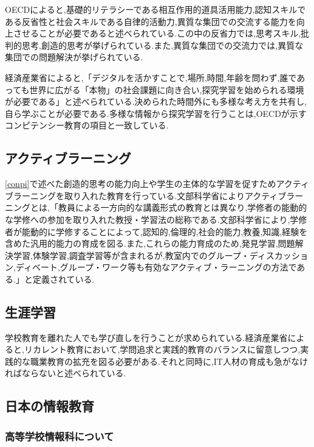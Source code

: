 \documentclass[11pt, a4paper]{jreport}
\begin{document}
OECDによると,基礎的リテラシーである相互作用的道具活用能力,認知スキルである反省性と社会スキルである自律的活動力,異質な集団での交流する能力を向上させることが必要であると述べられている.この中の反省力では,思考スキル,批判的思考,創造的思考が挙げられている.また,異質な集団での交流力では,異質な集団での問題解決が挙げられている.

経済産業省によると,「デジタルを活かすことで,場所,時間,年齢を問わず,誰であっても世界に広がる「本物」の社会課題に向き合い,探究学習を始められる環境が必要である」と述べられている\cite{bib:mirai}.決められた時間外にも多様な考え方を共有し,自ら学ぶことが必要である.多様な情報から探究学習を行うことは,OECDが示すコンピテンシー教育の項目と一致している.

\subsection{アクティブラーニング}\label{al_discription}

\ref{conpi}で述べた創造的思考の能力向上や学生の主体的な学習を促すためアクティブラーニングを取り入れた教育を行っている.文部科学省によりアクティブラーニングとは,「教員による一方向的な講義形式の教育とは異なり,学修者の能動的な学修への参加を取り入れた教授・学習法の総称である.文部科学省により,学修者が能動的に学修することによって,認知的,倫理的,社会的能力,教養,知識,経験を含めた汎用的能力の育成を図る.また,これらの能力育成のため,発見学習,問題解決学習,体験学習,調査学習等が含まれるが,教室内でのグループ・ディスカッション,ディベート,グループ・ワーク等も有効なアクティブ・ラーニングの方法である.」と定義されている\cite{bib:kyouikutennkann}.

\subsection{生涯学習}\label{shyougai}

学校教育を離れた人でも学び直しを行うことが求められている\cite{bib:shougai}.経済産業省によると,リカレント教育において,学問追求と実践的教育のバランスに留意しつつ,実践的な職業教育の拡充を図る必要がある.それと同時に,IT人材の育成も急がなければならないと述べられている\cite{bib:zinnzaikyouka}.

\subsection{日本の情報教育}\label{japan_zyouhou}

\subsubsection{高等学校情報科について}
\end{document}
